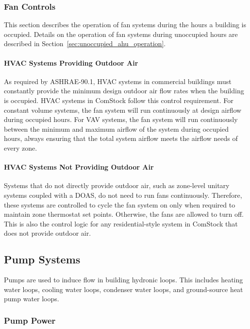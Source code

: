 \subsubsection{Fan Controls}

This section describes the operation of fan systems during the hours a building is occupied. Details on the operation of fan systems during unoccupied hours are described in Section~\ref{sec:unoccupied_ahu_operation}.

\paragraph{HVAC Systems Providing Outdoor Air}

As required by ASHRAE-90.1, HVAC systems in commercial buildings must constantly provide the minimum design outdoor air flow rates when the building is occupied. HVAC systems in ComStock follow this control requirement. For constant volume systems, the fan system will run continuously at design airflow during occupied hours. For VAV systems, the fan system will run continuously between the minimum and maximum airflow of the system during occupied hours, always ensuring that the total system airflow meets the airflow needs of every zone. 

\paragraph{HVAC Systems Not Providing Outdoor Air}

Systems that do not directly provide outdoor air, such as zone-level unitary systems coupled with a DOAS, do not need to run fans continuously. Therefore, these systems are controlled to cycle the fan system on only when required to maintain zone thermostat set points. Otherwise, the fans are allowed to turn off. This is also the control logic for any residential-style system in ComStock that does not provide outdoor air.

\subsection{Pump Systems}

Pumps are used to induce flow in building hydronic loops. This includes heating water loops, cooling water loops, condenser water loops, and ground-source heat pump water loops. 

\subsubsection{Pump Power}


